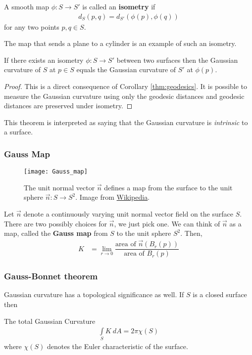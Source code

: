   \begin{definition}
    A smooth map $\phi: S \rightarrow S'$ is called an \textbf{isometry} if
    \begin{align*}
      d_S(p,q) = d_{S'}(\phi(p),\phi(q))
    \end{align*}for any two points $p,q \in S$.
  \end{definition}
  \noindent The map that sends a plane to a cylinder is an example of such an isometry.
  \begin{thm}
    \label{thm:theorema}
    If there exists an isometry $\phi: S \rightarrow S'$ between two surfaces then the Gaussian curvature of $S$ at $p \in S$ equals the Gaussian curvature of $S'$ at $\phi(p)$.
  \end{thm}
  \begin{proof}
    This is a direct consequence of Corollary \ref{thm:geodesics}. It is possible to measure the Gaussian curvature using only the geodesic distances and geodesic distances are preserved under isometry.
  \end{proof}
  This theorem is interpreted as saying that the Gaussian curvature is \emph{intrinsic} to a surface.


\subsubsection{Gauss Map}
\begin{figure}[H]
  \centering
    \texttt{[image: Gauss\_map]}
  \caption{The unit normal vector $\vec n$ defines a map from the surface to the unit sphere $\vec n : S \rightarrow S^2$. Image from \href{https://en.wikipedia.org/wiki/Gauss_map}{Wikipedia}.}
\end{figure}
Let $\vec n$ denote a continuously varying unit normal vector field on the surface $S$. There are two possibly choices for $\vec n$, we just pick one. We can think of $\vec n$ as a map, called the \textbf{Gauss map} from $S$ to the unit sphere $S^2$. Then,
\begin{align*}
  K &= \lim \limits_{r \rightarrow 0} \dfrac{\mbox{area of } \vec n (B_r(p)) }{\mbox{area of } B_r(p) }
\end{align*}

\subsubsection{Gauss-Bonnet theorem}
Gaussian curvature has a topological significance as well. If $S$ is a closed surface then
\begin{thm}
  The total Gaussian Curvature
  \begin{align*}
    \int \limits_S K \: dA = 2 \pi \chi(S)
  \end{align*}
  where $\chi(S)$ denotes the Euler characteristic of the surface.
\end{thm}

